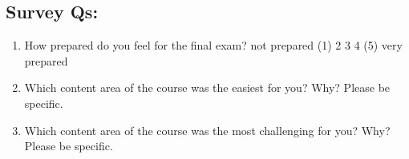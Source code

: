 \documentclass[
]{article}
\begin{document}
\subsection{Survey Qs:}\label{survey-qs}

\begin{enumerate}
\def\labelenumi{\arabic{enumi}.}
\item
  How prepared do you feel for the final exam? not prepared (1) 2 3 4
  (5) very prepared
\item
  Which content area of the course was the easiest for you? Why? Please
  be specific.
\item
  Which content area of the course was the most challenging for you?
  Why? Please be specific.
\end{enumerate}
\end{document}
